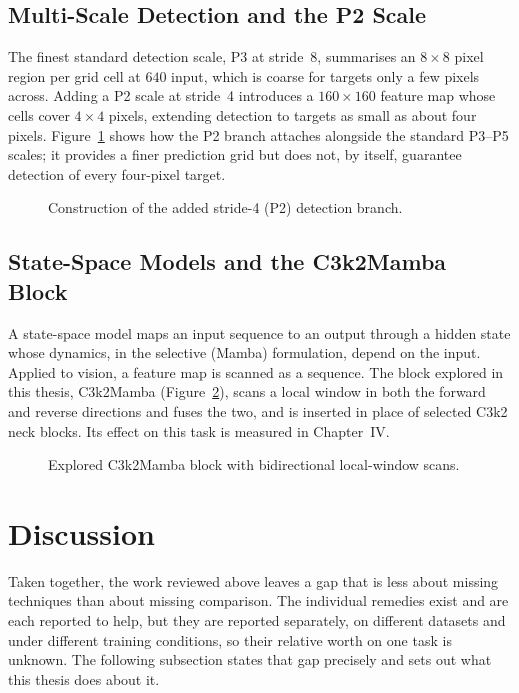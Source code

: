 \documentclass[12pt,a4paper,oneside]{report}
\begin{document}
\subsection{Multi-Scale Detection and the P2 Scale}
The finest standard detection scale, P3 at stride~8, summarises an $8\times8$ pixel
region per grid cell at $640$ input, which is coarse for targets only a few pixels
across. Adding a P2 scale at stride~4 introduces a $160\times160$ feature map whose
cells cover $4\times4$ pixels, extending detection to targets as small as about
four pixels. Figure~\ref{fig:p2} shows how the P2 branch attaches alongside the
standard P3--P5 scales; it provides a finer prediction grid but does not, by
itself, guarantee detection of every four-pixel target.

\begin{figure}[tbp]
  \centering
  \caption{Construction of the added stride-4 (P2) detection branch.}
  \label{fig:p2}
\end{figure}

\subsection{State-Space Models and the C3k2Mamba Block}
A state-space model maps an input sequence to an output through a hidden state
whose dynamics, in the selective (Mamba) formulation, depend on the input. Applied
to vision, a feature map is scanned as a sequence. The block explored in this
thesis, C3k2Mamba (Figure~\ref{fig:mamba}), scans a local window in both the forward
and reverse directions and fuses the two, and is inserted in place of selected C3k2
neck blocks. Its effect on this task is measured in Chapter~IV.

\begin{figure}[tbp]
  \centering
  \caption{Explored C3k2Mamba block with bidirectional local-window scans.}
  \label{fig:mamba}
\end{figure}

\section{Discussion}

Taken together, the work reviewed above leaves a gap that is less about missing
techniques than about missing comparison. The individual remedies exist and are
each reported to help, but they are reported separately, on different datasets
and under different training conditions, so their relative worth on one task is
unknown. The following subsection states that gap precisely and sets out what
this thesis does about it.
\end{document}
